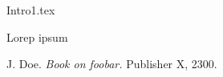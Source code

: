 \documentclass{ctuthesis}
\begin{document}
\maketitle
{Intro1.tex}



Lorep ipsum \cite{doe}



\begin{thebibliography}{1}
 J. Doe. \emph{Book on foobar.} Publisher X,
2300.
\end{thebibliography}
\end{document}
